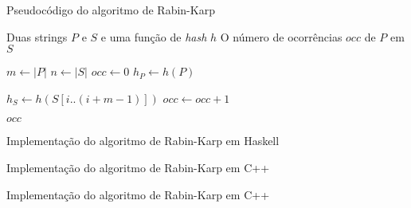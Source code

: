 \begin{frame}[fragile]{Pseudocódigo do algoritmo de Rabin-Karp}

    \begin{algorithm}[H]
        \caption{Algoritmo de Rabin-Karp -- Naive}
        \begin{algorithmic}[1]
            \Require Duas strings $P$ e $S$ e uma função de \textit{hash} $h$
            \Ensure O número de ocorrências $occ$ de $P$ em $S$

                \State $m \gets |P|$
                \State $n \gets |S|$
                \State $occ \gets 0$
                \State $h_P \gets h(P)$

                    \State $h_S \gets h(S[i..(i + m - 1)])$
                            \State $occ \gets occ + 1$
                        \EndIf
                    \EndIf
                \EndFor

                \State \Return $occ$
            \EndFunction
        \end{algorithmic}
    \end{algorithm}

\end{frame}

\begin{frame}[fragile]{Implementação do algoritmo de Rabin-Karp em Haskell}
\end{frame}

\begin{frame}[fragile]{Implementação do algoritmo de Rabin-Karp em C++}
\end{frame}

\begin{frame}[fragile]{Implementação do algoritmo de Rabin-Karp em C++}
\end{frame}
